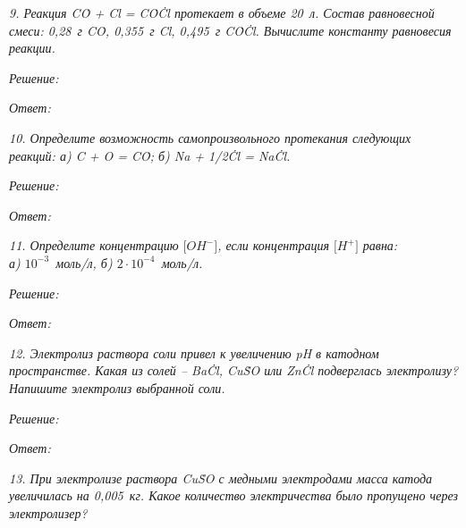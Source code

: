 \newpage %

\emph{9. Реакция C\.O + Cl =
C\.O\.Cl протекает в объеме 20~л. Состав равновесной смеси:
0,28~г C\.O, 0,355~г Cl, 0,495~г C\.O\.Cl. Вычислите константу
равновесия реакции.}

\vspace*{2em}
\emph{Решение:}

\vspace*{2em}
\emph{Ответ: }

\newpage %

\emph{10. Определите возможность самопроизвольного протекания следующих
реакций: а) C + O = C\.O; \qquad
б) Na + 1\!/2\.Cl = Na\.Cl.}

\vspace*{2em}
\emph{Решение:}

\vspace*{2em}
\emph{Ответ: }

\newpage %

\emph{11. Определите концентрацию \( \bigr[OH^-\bigl] \), если концентрация
\( \bigr[H^+\bigl] \) равна:\\
а) \( 10^{-3} \)~моль/л, б) \( 2\cdot 10^{-4} \)~моль/л.}

\vspace*{2em}
\emph{Решение:}

\vspace*{2em}
\emph{Ответ: }

\newpage %

\emph{12. Электролиз раствора соли привел к увеличению pH в катодном
пространстве. Какая из солей -- Ba\.Cl, Cu\.SO или Zn\.Cl
подверглась электролизу? Напишите электролиз выбранной соли.}

\vspace*{2em}
\emph{Решение:}

\vspace*{2em}
\emph{Ответ: }

\newpage %

\emph{13. При электролизе раствора Cu\.SO с медными электродами масса
катода увеличилась на 0,005~кг. Какое количество электричества было пропущено
через электролизер?}

